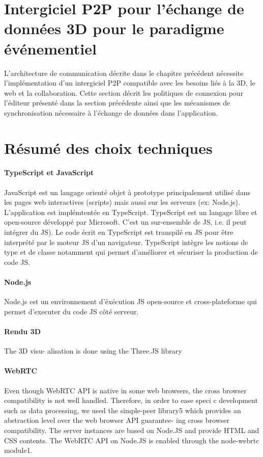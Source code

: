 

\section{Intergiciel P2P pour l'échange de données 3D pour le paradigme 
événementiel}

L'architecture de communication décrite dans le chapitre précédent nécessite 
l'implémentation d'un intergiciel \gls{P2P} compatible avec les besoins liés à la 3D, le 
web et la collaboration. Cette section décrit les politiques de connexion pour 
l'éditeur présenté dans la section précédente ainsi que les mécanismes de 
synchronisation nécessaire à l'échange de données dans l'application. 




\section{Résumé des choix techniques}

\paragraph{TypeScript et JavaScript}
JavaScript est un langage orienté objet à prototype principalement utilisé dans les 
pages web interactives (scripts) mais aussi sur les serveurs (ex: Node.js).
L'application est implémtentée en TypeScript. TypeScript est un langage libre et 
open-source développé par Microsoft. C'est un sur-ensemble de \gls{JS}, i.e. il 
peut intégrer du \gls{JS}). Le code écrit en TypeScript est transpilé en \gls{JS} 
pour être interprété par le moteur \gls{JS} d'un navigateur. TypeScript intègre les 
notions de type et de classe notamment qui permet d'améliorer et sécuriser la 
production de code \gls{JS}.


\paragraph{Node.js}
Node.js est un environnement d'éxécution \gls{JS} open-source et 
cross-plateforme qui permet d'executer du code \gls{JS} côté serveur. 

\paragraph{Rendu 3D}The 3D visu- alisation is done using the Three.JS library
\paragraph{WebRTC}
Even though WebRTC API is native in some web browsers, the cross browser 
compatibility is not well handled. 
Therefore, in order to ease speci c development such as data processing, we used 
the simple-peer library5 which provides an abstraction level over the web browser 
API guarantee- ing cross browser compatibility. The server instances are based on 
Node.JS and provide HTML and CSS contents. The WebRTC API on Node.JS is 
enabled through the node-webrtc module1.

